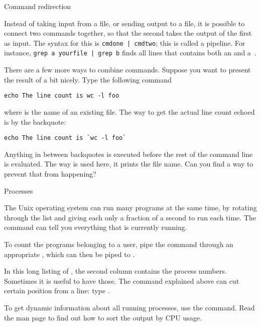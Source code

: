  {Command redirection}

Instead of taking input from a file, or sending output to a file, it
is possible to connect two commands together, so that the second takes
the output of the first as input. The syntax for this is
\verb+cmdone | cmdtwo+; this is called a pipeline. For instance,
\verb+grep a yourfile | grep b+ finds all lines that contains both an
 and a~.

{}{}

There are a few more ways to combine commands. Suppose you want to
present the result of  a bit nicely. Type the following command
\begin{verbatim}
echo The line count is wc -l foo
\end{verbatim}
where  is the name of an existing file. The way to
get the actual line count echoed is by the backquote:
\begin{verbatim}
echo The line count is `wc -l foo`
\end{verbatim}
Anything in between backquotes is executed before the rest of the
command line is evaluated. The way  is used here, it prints the
file name. Can you find a way to prevent that from happening?

 {Processes}

The Unix operating system can run many programs at the same time, by
rotating through
the list and giving each only a  fraction of a second to run each time.
The command  can tell you everything that is currently running.

{To count the programs belonging to a user, pipe the  command
  through an appropriate , which can then be piped to .}
{}

In this long listing of , the second column contains the process
numbers. Sometimes it is useful to have those. The  command
explained above can
cut certain position from a line: type .

To get dynamic information about all running processes, use the
 command. Read the man page to find out how to sort the output
by CPU usage.

